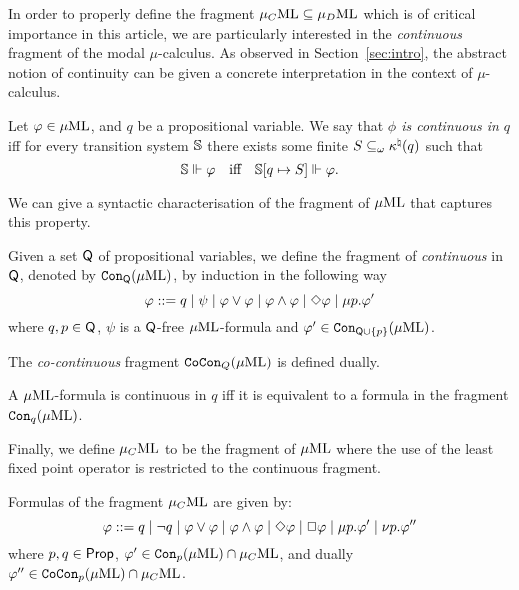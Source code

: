 In order to properly define the fragment $\mu_{C}\mathrm{ML} \subseteq \mu_{D}\mathrm{ML}$ which is of
critical importance in this article, we are particularly interested in the 
\emph{continuous} fragment of the modal $\mu$-calculus. 
As observed in Section~\ref{sec:intro}, the abstract notion of continuity can 
be given a concrete interpretation in the context of $\mu$-calculus.
%
\begin{definition}
Let $\varphi \in \mu\mathrm{ML}$, and $q$ be a propositional variable. 
We say that \emph{$\phi$ is continuous in $q$} iff for every transition 
system $\mathbb{S}$ there exists some finite $S \subseteq_\omega \kappa^\natural(q)$ such that
$$
\bbS \mmodels \phi \quad\text{iff}\quad \bbS[q \mapsto S] \mmodels \phi.
$$
\end{definition}

We can give a syntactic characterisation of the fragment of $\mu\mathrm{ML}$ that captures
this property. 

\begin{definition}
Given a set $\mathsf{Q}$ of propositional variables, we define the fragment of \muML 
\emph{continuous} in $\mathsf{Q}$, denoted by $\mathtt{Con}_{\mathsf{Q}}(\mu\mathrm{ML})$, by induction 
in the following way
\begin{equation*}
   \varphi \mathrel{::=}  q
   \mid \psi
   \mid \varphi \lor \varphi
   \mid \varphi \land \varphi
   \mid \Diamond \varphi
   \mid \mu p.\varphi'
\end{equation*}
%
where $q,p \in \mathsf{Q}$, $\psi$ is a $\mathsf{Q}$-free $\mu\mathrm{ML}$-formula and 
$\varphi' \in \mathtt{Con}_{\mathsf{Q}\cup\{p\}}(\mu\mathrm{ML})$.

The  \emph{co-continuous} fragment $\mathtt{CoCon}_{Q}(\mu\mathrm{ML})$ is defined dually. 
\end{definition}

\begin{proposition}\label{prop:FVcont}
A $\mu\mathrm{ML}$-formula is continuous in $q$ iff it is equivalent to a formula in the
fragment $\mathtt{Con}_{q}(\mu\mathrm{ML})$.
\end{proposition}

Finally, we define $\mu_{C}\mathrm{ML}$ to be the fragment of $\mu\mathrm{ML}$ where the use of the
least fixed point operator is restricted to the continuous fragment. 

\begin{definition}
Formulas of the fragment $\mu_{C}\mathrm{ML}$ are given by:%
\begin{equation*}
   \varphi \mathrel{::=}  q \mid \lnot q
    \mid \varphi \lor \varphi
        \mid \varphi \land \varphi
    \mid \Diamond \varphi
     \mid \Box \varphi \mid
    \mu p.\varphi' 
    \mid \nu p.\varphi''
    \end{equation*}
%
where $p,q \in \mathsf{Prop}$,  $\varphi' \in \mathtt{Con}_{p}(\mu\mathrm{ML}) \cap \mu_{C}\mathrm{ML}$, and dually 
$\varphi'' \in \mathtt{CoCon}_{p}(\mu\mathrm{ML}) \cap \mu_{C}\mathrm{ML}$.
\end{definition}

